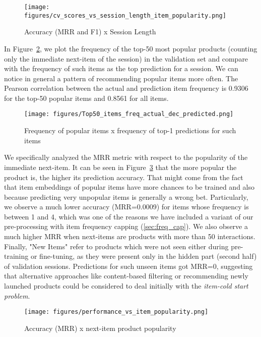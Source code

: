\documentclass[sigconf,screen]{acmart}
\begin{document}
\begin{figure}[ht]
  \centering
  \texttt{[image: figures/cv\_scores\_vs\_session\_length\_item\_popularity.png]}
  \caption{Accuracy (MRR and F1) x Session Length}
  \label{fig:acc_session_length}
\end{figure}

In Figure~\ref{fig:freq_actual_x_predicted}, we plot the frequency of the top-50 most popular products (counting only the immediate next-item of the session) in the validation set and compare with the frequency of such items as the top prediction for a session. We can notice in general a pattern of recommending popular items more often. The Pearson correlation between the actual and prediction item frequency is 0.9306 for the top-50 popular items and 0.8561 for all items.

\begin{figure}[ht]
  \centering
  \texttt{[image: figures/Top50\_items\_freq\_actual\_dec\_predicted.png]}
  \caption{Frequency of popular items x frequency of top-1 predictions for such items}
  \label{fig:freq_actual_x_predicted}
\end{figure}

We specifically analyzed the MRR metric with respect to the popularity of the immediate next-item. It can be seen in Figure~\ref{fig:mrr_pop} that the more popular the product is, the higher its prediction accuracy. That might come from the fact that item embeddings of popular items have more chances to be trained and also because predicting very unpopular items is generally a wrong bet. Particularly, we observe a much lower accuracy (MRR=0.0009) for items whose frequency is between 1 and 4, which was one of the reasons we have included a variant of our pre-processing with item frequency capping (\cref{sec:freq_cap}). We also observe a much higher MRR when next-items are products with more than 50 interactions. Finally, "New Items" refer to products which were not seen either during pre-training or fine-tuning, as they were present only in the hidden part (second half) of validation sessions. Predictions for such unseen items got MRR=0, suggesting that alternative approaches like content-based filtering or recommending newly launched products could be considered to deal initially with the \emph{item-cold start problem}.

\begin{figure}[ht]
  \centering
  \texttt{[image: figures/performance\_vs\_item\_popularity.png]}
  \caption{Accuracy (MRR) x next-item product popularity}
  \label{fig:mrr_pop}
\end{figure}
\end{document}
